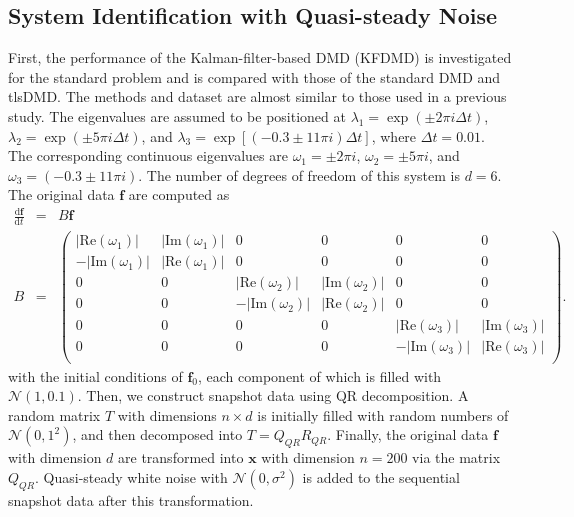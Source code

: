 \documentclass[aip,graphicx]{revtex4-1}
\begin{document}
\subsection{System Identification with Quasi-steady Noise}
\label{sec:RESSWON}
First, the performance of the Kalman-filter-based DMD (KFDMD) is investigated for the standard problem and is compared with those of the standard DMD and tlsDMD. 
The methods and dataset are almost similar to those used in a previous study.\cite{Hemati2017}
The eigenvalues are assumed to be positioned at $\lambda_1 = \exp\left( \pm 2\pi i \Delta t \right)$, $\lambda_2 = \exp\left( \pm 5\pi i \Delta t \right)$, and $\lambda_3 = \exp\left[\left( -0.3 \pm 11\pi i\right)\Delta t\right]$, where $\Delta t = 0.01$. The corresponding continuous eigenvalues are $\omega_1 =  \pm 2\pi i  $, $\omega_2 =  \pm 5\pi i $, and $\omega_3 = \left( -0.3 \pm 11\pi i\right)$. The number of degrees of freedom of this system is $d=6$. The original data $\bm{f}$ are computed as
\begin{eqnarray}
\frac{\text{d}\bm{f}}{\text{d}t}&=&B\bm{f} \label{eq:fcont}\\
B&=&\left(\begin{array}{cccccc}
 |\text{Re}(\omega_1)| & |\text{Im}(\omega_1)| & 0 & 0  & 0  & 0\\
-|\text{Im}(\omega_1)| & |\text{Re}(\omega_1)|  & 0 & 0  & 0  & 0\\
0  & 0& |\text{Re}(\omega_2)| & |\text{Im}(\omega_2)| & 0 & 0 \\
0  & 0&-|\text{Im}(\omega_2)| & |\text{Re}(\omega_2)|  & 0 & 0  \\
0 & 0  & 0  & 0&  |\text{Re}(\omega_3)| & |\text{Im}(\omega_3)|  \\
0 & 0  & 0  & 0& -|\text{Im}(\omega_3)| & |\text{Re}(\omega_3)|  \\
\end{array}
\right).
\end{eqnarray}
with the initial conditions of $\bm{f}_0$, each component of which is filled with $\mathcal{N}\left(1,0.1 \right)$.
Then, we construct snapshot data using QR decomposition.
A random matrix $T$ with dimensions $n\times d$ is initially filled with random numbers of $\mathcal{N}\left(0,1^2\right)$,  and then decomposed into $T=Q_{QR}R_{QR}$.
Finally, the original data $\bm{f}$ with dimension $d$ are transformed into $\bm{x}$ with dimension $n=200$ via the matrix $Q_{QR}$.
Quasi-steady white noise with $\mathcal{N}\left(0,\sigma^2\right)$ is added to the sequential snapshot data after this transformation.
\end{document}
